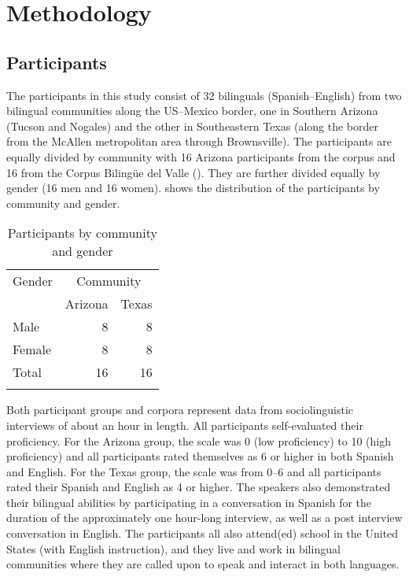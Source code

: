 \documentclass[output=paper]{langscibook}
\begin{document}
\section{Methodology}\label{sec:aztx:2}
\subsection{Participants}\label{sec:aztx:2.1}



The participants in this study consist of 32 bilinguals (Spanish–English) from two bilingual communities along the US–Mexico border, one in Southern Arizona (Tucson and Nogales) and the other in Southeastern Texas (along the border from the McAllen metropolitan area through Brownsville). The participants are equally divided by community with 16 Arizona participants from the \citet{Bessett2012} corpus and 16 from the Corpus Bilingüe del Valle (\citealt{ChristoffersenBessett2019}). They are further divided equally by gender (16 men and 16 women).  shows the distribution of the participants by community and gender.


\begin{table}
\begin{tabular}{lrr}
\lsptoprule
Gender & \multicolumn{2}{c}{Community}\\\cmidrule(lr){2-3}
	 & Arizona &  Texas\\\midrule
Male &  8 &  8\\
Female &  8 &  8\\
Total &  16 &  16\\
\lspbottomrule
\end{tabular}
\caption{Participants by community and gender\label{tab:aztx:1}}
\end{table}

Both participant groups and corpora represent data from sociolinguistic interviews of about an hour in length. All participants self-evaluated their proficiency. For the Arizona group, the scale was 0 (low proficiency) to 10 (high proficiency) and all participants rated themselves as 6 or higher in both Spanish and English. For the Texas group, the scale was from 0–6 and all participants rated their Spanish and English as 4 or higher. The speakers also demonstrated their bilingual abilities by participating in a conversation in Spanish for the duration of the approximately one hour-long interview, as well as a post interview conversation in English. The participants all also attend(ed) school in the United States (with English instruction), and they live and work in bilingual communities where they are called upon to speak and interact in both languages.
\end{document}
